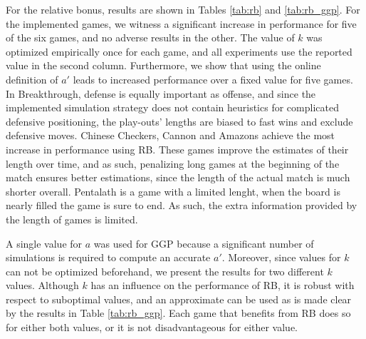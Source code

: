 \documentclass{ecai2014}
\begin{document}
For the relative bonus, results are shown in Tables \ref{tab:rb} and \ref{tab:rb_ggp}. For the implemented games, we witness a significant increase in performance for five of the six games, and no adverse results in the other. The value of $k$ was optimized empirically once for each game, and all experiments use the reported value in the second column. Furthermore, we show that using the online definition of $a'$ leads to increased performance over a fixed value for five games. In Breakthrough, defense is equally important as offense, and since the implemented simulation strategy does not contain heuristics for complicated defensive positioning, the play-outs' lengths are biased to fast wins and exclude defensive moves.
Chinese Checkers, Cannon and Amazons achieve the most increase in performance using RB. These games improve the estimates of their length over time, and as such, penalizing long games at the beginning of the match ensures better estimations, since the length of the actual match is much shorter overall. Pentalath is a game with a limited lenght, when the board is nearly filled the game is sure to end. As such, the extra information provided by the length of games is limited.

A single value for $a$ was used for GGP because a significant number of simulations is required to compute an accurate $a'$. Moreover, since values for $k$ can not be optimized beforehand, we present the results for two different $k$ values. Although $k$ has an influence on the performance of RB, it is robust with respect to suboptimal values, and an approximate can be used as is made clear by the results in Table \ref{tab:rb_ggp}. Each game that benefits from RB does so for either both values, or it is not disadvantageous for either value.
\end{document}
